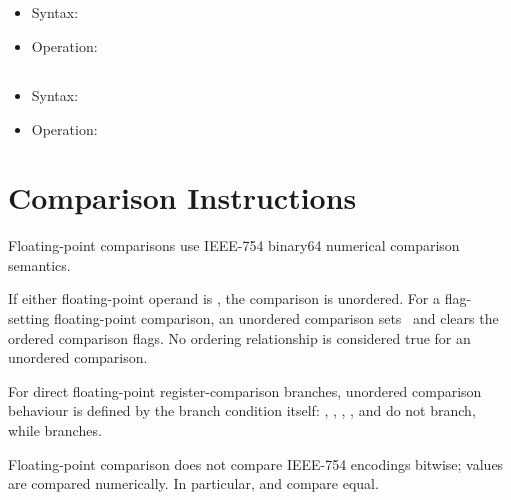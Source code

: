 \subsection{}

\begin{itemize}
\item Syntax: 
\item Operation: 
\end{itemize}

\subsection{}

\begin{itemize}
\item Syntax: 
\item Operation: 
\end{itemize}

\section{Comparison Instructions}

Floating-point comparisons use IEEE-754 binary64 numerical comparison semantics.

If either floating-point operand is , the comparison is unordered.
For a flag-setting floating-point comparison, an unordered comparison sets
\flagE\ and clears the ordered comparison flags. No ordering relationship is
considered true for an unordered comparison.

For direct floating-point register-comparison branches, unordered comparison
behaviour is defined by the branch condition itself: , ,
, , and  do not branch, while  branches.

Floating-point comparison does not compare IEEE-754 encodings bitwise; values are
compared numerically. In particular,  and  compare equal.

\subsection{}


